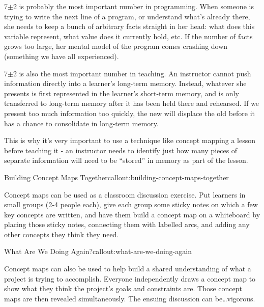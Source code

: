 7$\pm$2 is probably the most important number in programming. When
someone is trying to write the next line of a program, or understand
what's already there, she needs to keep a bunch of arbitrary facts
straight in her head: what does this variable represent, what value
does it currently hold, etc. If the number of facts grows too large,
her mental model of the program comes crashing down (something we have
all experienced).

7$\pm$2 is also the most important number in teaching. An instructor
cannot push information directly into a learner's long-term
memory. Instead, whatever she presents is first represented in the
learner's short-term memory, and is only transferred to long-term
memory after it has been held there and rehearsed. If we present too
much information too quickly, the new will displace the old before it
has a chance to consolidate in long-term memory.

This is why it's very important to use a technique like concept
mapping a lesson before teaching it - an instructor needs to identify
just how many pieces of separate information will need to be
``stored'' in memory as part of the lesson.

\begin{callout}{Building Concept Maps Together}{callout:building-concept-maps-together}

Concept maps can be used as a classroom discussion exercise. Put
learners in small groups (2-4 people each), give each group some sticky
notes on which a few key concepts are written, and have them build a
concept map on a whiteboard by placing those sticky notes, connecting
them with labelled arcs, and adding any other concepts they think they
need.
\end{callout}

\begin{callout}{What Are We Doing Again?}{callout:what-are-we-doing-again}

Concept maps can also be used to help build a shared understanding of
what a project is trying to accomplish. Everyone independently draws a
concept map to show what they think the project's goals and constraints
are. Those concept maps are then revealed simultaneously. The ensuing
discussion can be\ldots{}vigorous.

\end{callout}


